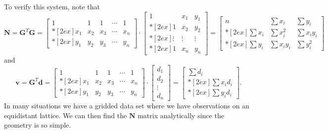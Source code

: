 To verify this system, note that
\begin{equation}
\mathbf{N} = \mathbf{G}^T \mathbf{G} = \left [ \begin{array}{ccccc}
1 & 1 & 1 & \cdots & 1 \\*[2ex]
x_1 & x_2 & x_3 & \cdots & x_n \\*[2ex]
y_1 & y_2 & y_3 & \cdots & y_n \end{array}  \right ] \cdot 
\left [ \begin{array}{ccc}
1 & x_1 & y_1 \\*[2ex]
1 & x_2 & y_2 \\*[2ex]
\vdots & \vdots & \vdots \\*[2ex]
1 & x_n & y_n
\end{array} \right ]
= \left [ \begin{array}{ccc}
n & \displaystyle  \sum x_i & \displaystyle \sum y_i \\*[2ex]
\displaystyle \sum x_i & \displaystyle \sum x^2_i & \displaystyle \sum x_i y_i \\*[2ex]
\displaystyle \sum y_i & \displaystyle \sum x_i y_i & \displaystyle \sum y^2_i
\end{array} \right ]
\end{equation}
and
\begin{equation}
\mathbf{v} = \mathbf{G}^T\mathbf{d} = \left [ \begin{array}{ccccc}
1 & 1 & 1 & \cdots & 1 \\*[2ex]
x_1 & x_2 & x_3 & \cdots & x_n \\*[2ex]
y_1 & y_2 & y_3 & \cdots  & y_n \end{array}  \right ] \cdot
\left [ \begin{array}{c}
d_1 \\
d_2 \\
\vdots \\
d_n
\end{array} \right ] = 
\left [ \begin{array}{c}
\displaystyle \sum d_i \\*[2ex]
\displaystyle \sum x_i d_i \\*[2ex]
\displaystyle \sum y_i d_i 
\end{array}
\right ] .
\end{equation}
In many situations we have a gridded data set where we have observations on an equidistant 
lattice.  We can then find the $\mathbf{N}$ matrix analytically since the geometry is so simple.
